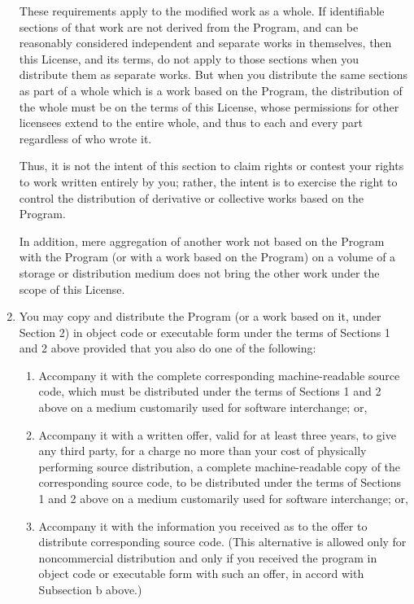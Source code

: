\documentclass[se]{uw-wkrpt}
\begin{document}
\begin{singlespacing}
\begin{enumerate}
These requirements apply to the modified work as a whole.  If
identifiable sections of that work are not derived from the Program,
and can be reasonably considered independent and separate works in
themselves, then this License, and its terms, do not apply to those
sections when you distribute them as separate works.  But when you
distribute the same sections as part of a whole which is a work based
on the Program, the distribution of the whole must be on the terms of
this License, whose permissions for other licensees extend to the
entire whole, and thus to each and every part regardless of who wrote it.

Thus, it is not the intent of this section to claim rights or contest
your rights to work written entirely by you; rather, the intent is to
exercise the right to control the distribution of derivative or
collective works based on the Program.

In addition, mere aggregation of another work not based on the Program
with the Program (or with a work based on the Program) on a volume of
a storage or distribution medium does not bring the other work under
the scope of this License.

\item You may copy and distribute the Program (or a work based on it,
under Section 2) in object code or executable form under the terms of
Sections 1 and 2 above provided that you also do one of the following:

    \begin{enumerate}
    \item Accompany it with the complete corresponding machine-readable
    source code, which must be distributed under the terms of Sections
    1 and 2 above on a medium customarily used for software interchange; or,

    \item Accompany it with a written offer, valid for at least three
    years, to give any third party, for a charge no more than your
    cost of physically performing source distribution, a complete
    machine-readable copy of the corresponding source code, to be
    distributed under the terms of Sections 1 and 2 above on a medium
    customarily used for software interchange; or,

    \item Accompany it with the information you received as to the offer
    to distribute corresponding source code.  (This alternative is
    allowed only for noncommercial distribution and only if you
    received the program in object code or executable form with such
    an offer, in accord with Subsection b above.)
    \end{enumerate}


\end{enumerate}
\end{singlespacing}
\end{document}
